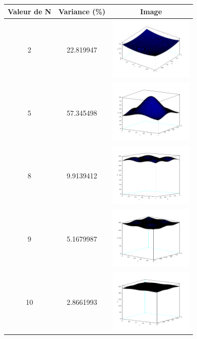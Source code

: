 \documentclass[a4paper,11pt]{article}
\begin{document}
 \begin{center}
    \begin{tabular}{|c|c|c|}
      \hline
      \textbf{Valeur de N} & \textbf{Variance (\%)} & \textbf{Image}\\
      \hline
      2 & 22.819947 & \includegraphics[width=4cm]{../grille2.png}\\
      \hline
      5 & 57.345498 & \includegraphics[width=4cm]{../grille5.png}\\
      \hline
      8 & 9.9139412 & \includegraphics[width=4cm]{../grille8.png}\\
      \hline
      9 & 5.1679987 & \includegraphics[width=4cm]{../grille9.png}\\
      \hline
      10 & 2.8661993 & \includegraphics[width=4cm]{../grille10.png}\\
      \hline
    \end{tabular}
  \end{center}
  
\end{document}
